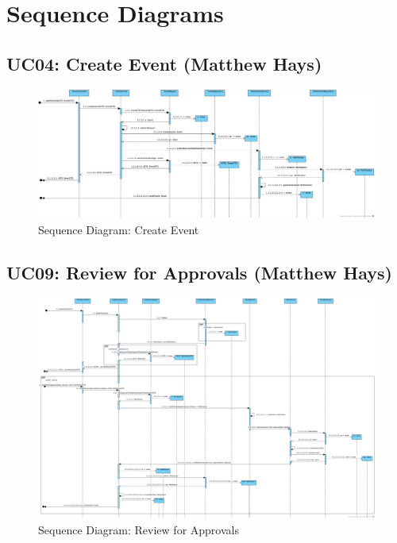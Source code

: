 \documentclass{article}
\begin{document}
\section{Sequence Diagrams}
\subsection{UC04: Create Event (Matthew Hays)}
\begin{figure}[H]
    \centering
    \includegraphics[width=.98\textwidth]{images/UC04 - Create Event.png}
    \centering
    \caption{Sequence Diagram: Create Event}
\end{figure}
\subsection{UC09: Review for Approvals (Matthew Hays)}
\begin{figure}[H]
    \centering
    \includegraphics[width=.98\textwidth]{images/UC09 - Review for Approval.png}
    \centering
    \caption{Sequence Diagram: Review for Approvals}
\end{figure}
\end{document}

